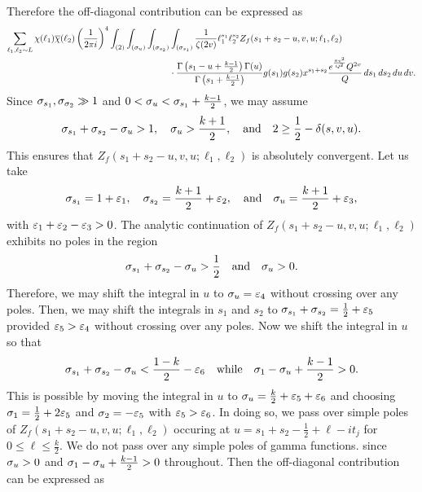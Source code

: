 \documentclass[12pt,reqno,oneside]{amsart}
\begin{document}
    Therefore the off-diagonal contribution can be expressed as
    \begin{align*}
      \sum_{\ell_{1},\ell_{2} \sim L}\chi(\ell_{1})\overline{\chi}(\ell_{2})\left(\frac{1}{2\pi i}\right)^{4}\int_{(2)}\int_{(\sigma_{u})}\int_{(\sigma_{s_{2}})}&\int_{(\sigma_{s_{1}})}\frac{1}{\zeta(2v)}\ell_{1}^{s_{1}}\ell_{2}^{s_{2}}Z_{f}(s_{1}+s_{2}-u,v,u;\ell_{1},\ell_{2}) \\
      &\cdot \frac{\Gamma\left(s_{1}-u+\frac{k-1}{2}\right)\Gamma(u)}{\Gamma\left(s_{1}+\frac{k-1}{2}\right)}g(s_{1})g(s_{2})x^{s_{1}+s_{2}}\frac{e^{\frac{\pi v^{2}}{Q^{2}}}Q^{2v}}{Q}\,ds_{1}\,ds_{2}\,du\,dv.
    \end{align*}
    Since $\sigma_{s_{1}},\sigma_{\sigma_{2}} \gg 1$ and $0 < \sigma_{u} < \sigma_{s_{1}}+\frac{k-1}{2}$, we may assume
    \[
      \sigma_{s_{1}}+\sigma_{s_{2}}-\sigma_{u} > 1, \quad \sigma_{u} > \frac{k+1}{2}, \quad \text{and} \quad 2 \ge \frac{1}{2}-\delta(s,v,u).
    \]
    This ensures that $Z_{f}(s_{1}+s_{2}-u,v,u;\ell_{1},\ell_{2})$ is absolutely convergent. Let us take
    \[
      \sigma_{s_{1}} = 1+\varepsilon_{1}, \quad \sigma_{s_{2}} = \frac{k+1}{2}+\varepsilon_{2}, \quad \text{and} \quad \sigma_{u} = \frac{k+1}{2}+\varepsilon_{3},
    \]
    with $\varepsilon_{1}+\varepsilon_{2}-\varepsilon_{3} > 0$. The analytic continuation of $Z_{f}(s_{1}+s_{2}-u,v,u;\ell_{1},\ell_{2})$ exhibits no poles in the region
    \[
      \sigma_{s_{1}}+\sigma_{s_{2}}-\sigma_{u} > \frac{1}{2} \quad \text{and} \quad \sigma_{u} > 0.
    \]
    Therefore, we may shift the integral in $u$ to $\sigma_{u} = \varepsilon_{4}$ without crossing over any poles. Then, we may shift the integrals in $s_{1}$ and $s_{2}$ to $\sigma_{s_{1}}+\sigma_{s_{2}} = \frac{1}{2}+\varepsilon_{5}$ provided $\varepsilon_{5} > \varepsilon_{4}$ without crossing over any poles. Now we shift the integral in $u$ so that
    \[
      \sigma_{s_{1}}+\sigma_{s_{2}}-\sigma_{u} < \frac{1-k}{2}-\varepsilon_{6} \quad \text{while} \quad \sigma_{1}-\sigma_{u}+\frac{k-1}{2} > 0.
    \]
    This is possible by moving the integral in $u$ to $\sigma_{u} = \frac{k}{2}+\varepsilon_{5}+\varepsilon_{6}$ and choosing $\sigma_{1} = \frac{1}{2}+2\varepsilon_{5}$ and $\sigma_{2} = -\varepsilon_{5}$ with $\varepsilon_{5} > \varepsilon_{6}$. In doing so, we pass over simple poles of $Z_{f}(s_{1}+s_{2}-u,v,u;\ell_{1},\ell_{2})$ occuring at $u = s_{1}+s_{2}-\frac{1}{2}+\ell-it_{j}$ for $0 \le \ell \le \frac{k}{2}$. We do not pass over any simple poles of gamma functions. since $\sigma_{u} > 0$ and $\sigma_{1}-\sigma_{u}+\frac{k-1}{2} > 0$ throughout. Then the off-diagonal contribution can be expressed as
\end{document}
